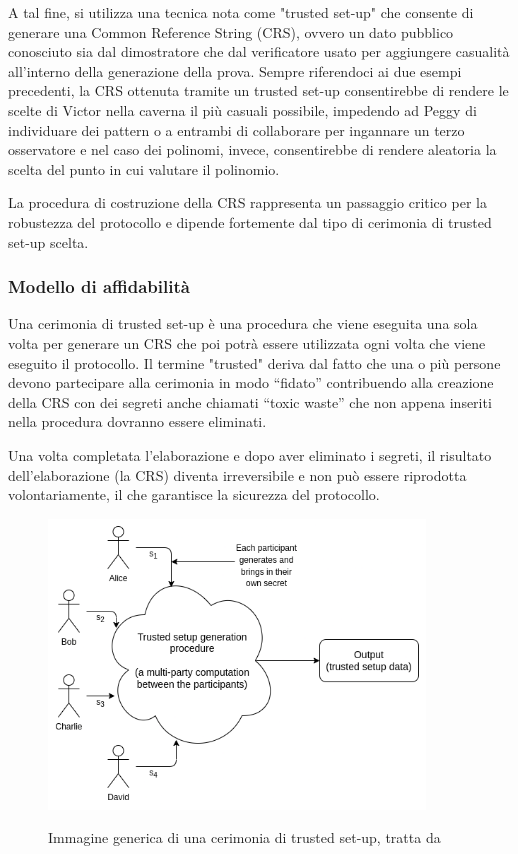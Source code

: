 A tal fine, si utilizza una tecnica nota come "trusted set-up" che consente di generare una Common Reference String
(CRS), ovvero un dato pubblico conosciuto sia dal dimostratore che dal verificatore usato per aggiungere casualità
all’interno della generazione della prova. Sempre riferendoci ai due esempi precedenti, la CRS ottenuta tramite un
trusted set-up consentirebbe di rendere le scelte di Victor nella caverna il più casuali possibile, impedendo ad Peggy
di individuare dei pattern o a entrambi di collaborare per ingannare un terzo osservatore e nel caso dei polinomi,
invece, consentirebbe di rendere aleatoria la scelta del punto in cui valutare il polinomio. 

La procedura di costruzione della CRS rappresenta un passaggio critico per la robustezza del protocollo e dipende
fortemente dal tipo di cerimonia di trusted set-up scelta.

\subsubsection{Modello di affidabilità}

Una cerimonia di trusted set-up è una procedura che viene eseguita una sola volta per generare un CRS che poi potrà
essere utilizzata ogni volta che viene eseguito il protocollo. Il termine "trusted" deriva dal fatto che una o più
persone devono partecipare alla cerimonia in modo “fidato” contribuendo alla creazione della CRS con dei segreti anche
chiamati “toxic waste” che non appena inseriti nella procedura dovranno essere eliminati. \clearpage

Una volta completata l'elaborazione e dopo aver eliminato i segreti, il risultato dell'elaborazione (la CRS) diventa
irreversibile e non può essere riprodotta volontariamente, il che garantisce la sicurezza del protocollo.
\begin{figure}[H]
    \centering
    \includegraphics[width=10cm]{./chapters/1.state-of-art/images/11.trusted_setups.png}
    \label{fig:trusted_setups}
    \captionsetup{justification=centering}
    \caption{Immagine generica di una cerimonia di trusted set-up, tratta da \cite{how-do-trusted-setups-work}}
\end{figure}

